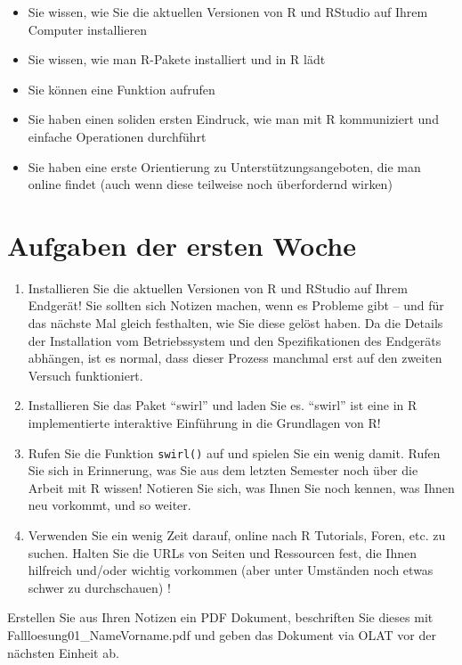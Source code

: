 \documentclass[
]{book}
\providecommand{\tightlist}{%
  \setlength{\itemsep}{0pt}\setlength{\parskip}{0pt}}
\begin{document}
\begin{itemize}
\tightlist
\item
  Sie wissen, wie Sie die aktuellen Versionen von R und RStudio auf Ihrem Computer installieren
\item
  Sie wissen, wie man R-Pakete installiert und in R lädt
\item
  Sie können eine Funktion aufrufen
\item
  Sie haben einen soliden ersten Eindruck, wie man mit R kommuniziert und einfache Operationen durchführt
\item
  Sie haben eine erste Orientierung zu Unterstützungsangeboten, die man online findet (auch wenn diese teilweise noch überfordernd wirken)
\end{itemize}

\hypertarget{aufgaben-der-ersten-woche}{%
\section{Aufgaben der ersten Woche}\label{aufgaben-der-ersten-woche}}

\begin{enumerate}
\def\labelenumi{\arabic{enumi})}
\item
  Installieren Sie die aktuellen Versionen von R und RStudio auf Ihrem Endgerät! Sie sollten sich Notizen machen, wenn es Probleme gibt -- und für das nächste Mal gleich festhalten, wie Sie diese gelöst haben. Da die Details der Installation vom Betriebssystem und den Spezifikationen des Endgeräts abhängen, ist es normal, dass dieser Prozess manchmal erst auf den zweiten Versuch funktioniert.
\item
  Installieren Sie das Paket ``swirl'' und laden Sie es. ``swirl'' ist eine in R implementierte interaktive Einführung in die Grundlagen von R!
\item
  Rufen Sie die Funktion \texttt{swirl()} auf und spielen Sie ein wenig damit. Rufen Sie sich in Erinnerung, was Sie aus dem letzten Semester noch über die Arbeit mit R wissen! Notieren Sie sich, was Ihnen Sie noch kennen, was Ihnen neu vorkommt, und so weiter.
\item
  Verwenden Sie ein wenig Zeit darauf, online nach R Tutorials, Foren, etc. zu suchen. Halten Sie die URLs von Seiten und Ressourcen fest, die Ihnen hilfreich und/oder wichtig vorkommen (aber unter Umständen noch etwas schwer zu durchschauen) !
\end{enumerate}

Erstellen Sie aus Ihren Notizen ein PDF Dokument, beschriften Sie dieses mit Fallloesung01\_NameVorname.pdf und geben das Dokument via OLAT vor der nächsten Einheit ab.

  
\end{document}
